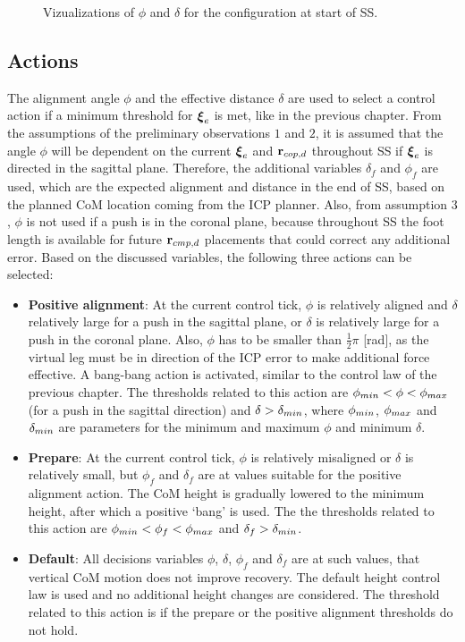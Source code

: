 \begin{figure}[h]
\begin{subfigure}{0.49\textwidth}
    \caption{}
     \label{fig:phiVizf}
  \end{subfigure}
  \caption{Vizualizations of $\phi$ and $\delta$ for the configuration at start of \ac{SS}.}
  \label{fig:phiViz}
\end{figure}

\subsection{Actions}
The alignment angle $\phi$ and the effective distance $\delta$ are used to select a control action if a minimum threshold for $\boldsymbol{\xi}_e$ is met, like in the previous chapter. From the assumptions of the preliminary observations $1$ and $2$, it is assumed that the angle $\phi$ will be dependent on the current $\boldsymbol{\xi}_e$ and $\mathbf{r}_{cop,d}$ throughout \ac{SS} if $\boldsymbol{\xi}_e$ is directed in the sagittal plane. Therefore, the additional variables $\delta_f$ and $\phi_f$ are used, which are the expected alignment and distance in the end of \ac{SS}, based on the planned \ac{CoM} location coming from the \ac{ICP} planner. Also, from assumption $3$, $\phi$ is not used if a push is in the coronal plane, because throughout \ac{SS} the foot length is available for future $\mathbf{r}_{cmp,d}$ placements that could correct any additional error. Based on the discussed variables, the following three actions can be selected:
\begin{itemize}
	\item \textbf{Positive alignment}: At the current control tick, $\phi$ is relatively aligned and $\delta$ relatively large for a push in the sagittal plane, or $\delta$ is relatively large for a push in the coronal plane. Also, $\phi$ has to be smaller than $\frac{1}{2}\pi$ [rad], as the virtual leg must be in direction of the \ac{ICP} error to make additional force effective. A bang-bang action is activated, similar to the control law of the previous chapter. The thresholds related to this action are $\phi_{min} < \phi < \phi_{max}$ (for a push in the sagittal direction) and $\delta > \delta_{min}$, where $\phi_{min}$, $\phi_{max}$ and $\delta_{min}$ are parameters for the minimum and maximum $\phi$ and minimum $\delta$.
	\item \textbf{Prepare}: At the current control tick, $\phi$ is relatively misaligned or $\delta$ is relatively small, but $\phi_f$ and $\delta_f$ are at values suitable for the positive alignment action. The \ac{CoM} height is gradually lowered to the minimum height, after which a positive `bang' is used. The the thresholds related to this action are $\phi_{min}<\phi_f<\phi_{max}$ and $\delta_f>\delta_{min}$.
	\item \textbf{Default}: All decisions variables $\phi$, $\delta$, $\phi_f$ and $\delta_f$ are at such values, that vertical \ac{CoM} motion does not improve recovery. The default height control law is used and no additional height changes are considered. The threshold related to this action is if the prepare or the positive alignment thresholds do not hold.
\end{itemize}


